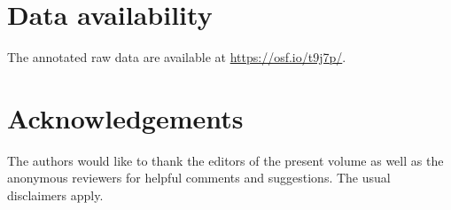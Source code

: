 \documentclass[output=paper]{langsci/langscibook}
\begin{document}
\section*{Data availability}
\begin{sloppypar}
The annotated raw data are available at
\url{https://osf.io/t9j7p/}.
\end{sloppypar}

\section*{Acknowledgements}

The authors would like to thank the editors of the present volume as well as the anonymous reviewers for helpful comments and suggestions. The usual disclaimers apply.

{\sloppy\printbibliography[heading=subbibliography]}
\end{document}

